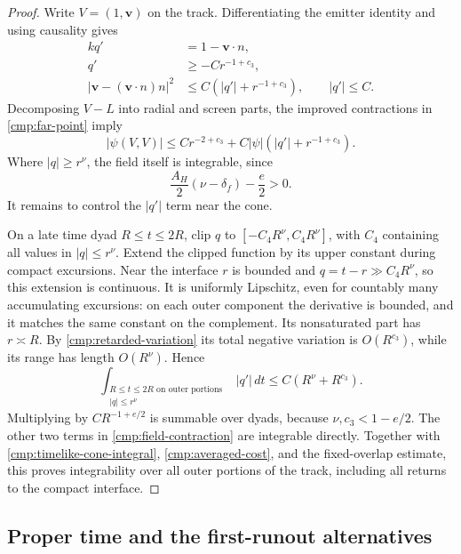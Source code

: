 \begin{proof}
Write $V=(1,\mathbf v)$ on the track. Differentiating the emitter
identity and using causality gives
\begin{equation}\label{cmp:retarded-variation}
 \begin{aligned}
 kq'&=1-\mathbf v\cdot n,\\
 q'&\geq-Cr^{-1+c_3},\\
 |\mathbf v-(\mathbf v\cdot n)n|^2
        &\leq C(|q'|+r^{-1+c_3}),\qquad |q'|\leq C.
 \end{aligned}
\end{equation}
Decomposing $V-L$ into radial and screen parts, the improved
contractions in \eqref{cmp:far-point} imply
\begin{equation}\label{cmp:field-contraction}
 |\psi(V,V)|\leq Cr^{-2+c_3}
              +C|\psi|(|q'|+r^{-1+c_3}).
\end{equation}
Where $|q|\geq r^\nu$, the field itself is integrable, since
\[
 \frac{A_H}{2}(\nu-\delta_f)-\frac e2>0.
\]
It remains to control the $|q'|$ term near the cone.

On a late time dyad $R\leq t\leq2R$, clip $q$ to
$[-C_4R^\nu,C_4R^\nu]$, with $C_4$ containing all values in
$|q|\leq r^\nu$. Extend the clipped function by its upper constant
during compact excursions. Near the interface $r$ is bounded and
$q=t-r\gg C_4R^\nu$, so this extension is continuous. It is uniformly
Lipschitz, even for countably many accumulating excursions: on each
outer component the derivative is bounded, and it matches the same
constant on the complement. Its nonsaturated part has $r\asymp R$.
By \eqref{cmp:retarded-variation} its total negative variation is
$O(R^{c_3})$, while its range has length $O(R^\nu)$. Hence
\begin{equation}\label{cmp:clipped-variation}
 \int_{\substack{R\leq t\leq2R\text{ on outer portions}\\
                        |q|\leq r^\nu}}|q'|\,dt
       \leq C(R^\nu+R^{c_3}).
\end{equation}
Multiplying by $CR^{-1+e/2}$ is summable over dyads, because
$\nu,c_3<1-e/2$. The other two terms in
\eqref{cmp:field-contraction} are integrable directly.
Together with \eqref{cmp:timelike-cone-integral},
\eqref{cmp:averaged-cost}, and the fixed-overlap estimate, this proves
integrability over all outer portions of the track, including all
returns to the compact interface.
\end{proof}

\subsection{Proper time and the first-runout alternatives}


